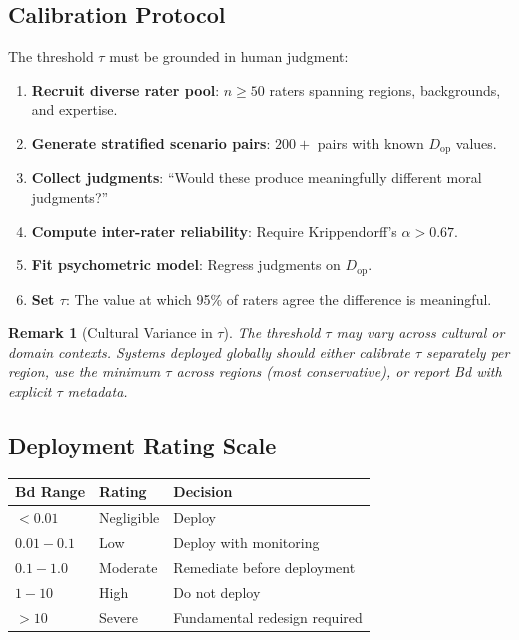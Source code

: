 \documentclass[12pt]{article}
\newtheorem{remark}[theorem]{Remark}
\begin{document}
\subsection{Calibration Protocol}

The threshold $\tau$ must be grounded in human judgment:
\begin{enumerate}
    \item \textbf{Recruit diverse rater pool}: $n \geq 50$ raters spanning regions, backgrounds, and expertise.
    \item \textbf{Generate stratified scenario pairs}: $200+$ pairs with known $D_{\mathrm{op}}$ values.
    \item \textbf{Collect judgments}: ``Would these produce meaningfully different moral judgments?''
    \item \textbf{Compute inter-rater reliability}: Require Krippendorff's $\alpha > 0.67$.
    \item \textbf{Fit psychometric model}: Regress judgments on $D_{\mathrm{op}}$.
    \item \textbf{Set $\tau$}: The value at which 95\% of raters agree the difference is meaningful.
\end{enumerate}

\begin{remark}[Cultural Variance in $\tau$]
\emph{The threshold $\tau$ may vary across cultural or domain contexts. Systems deployed globally should either calibrate $\tau$ separately per region, use the minimum $\tau$ across regions (most conservative), or report Bd with explicit $\tau$ metadata.}
\end{remark}

\subsection{Deployment Rating Scale}

\begin{table}[ht]
\centering
\begin{tabular}{@{}lll@{}}
\toprule
\textbf{Bd Range} & \textbf{Rating} & \textbf{Decision} \\
\midrule
$< 0.01$ & Negligible & Deploy \\
$0.01 - 0.1$ & Low & Deploy with monitoring \\
$0.1 - 1.0$ & Moderate & Remediate before deployment \\
$1 - 10$ & High & Do not deploy \\
$> 10$ & Severe & Fundamental redesign required \\
\bottomrule
\end{tabular}
\end{table}
\end{document}
